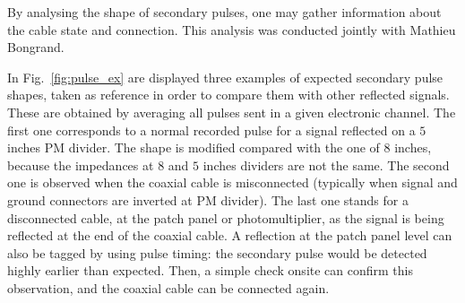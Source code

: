By analysing the shape of secondary pulses, one may gather information about the cable state and connection.
This analysis was conducted jointly with Mathieu Bongrand.

In Fig.~\ref{fig:pulse_ex} are displayed three examples of expected secondary pulse shapes, taken as reference in order to compare them with other reflected signals.
These are obtained by averaging all pulses sent in a given electronic channel.
The first one corresponds to a normal recorded pulse for a signal reflected on a $5$ inches PM divider.
The shape is modified compared with the one of $8$ inches, because the impedances at $8$ and $5$ inches dividers are not the same.
The second one is observed when the coaxial cable is misconnected (typically when signal and ground connectors are inverted at PM divider).
The last one stands for a disconnected cable, at the patch panel or photomultiplier, as the signal is being reflected at the end of the coaxial cable.
A reflection at the patch panel level can also be tagged by using pulse timing: the secondary pulse would be detected highly earlier than expected.
Then, a simple check onsite can confirm this observation, and the coaxial cable can be connected again.
